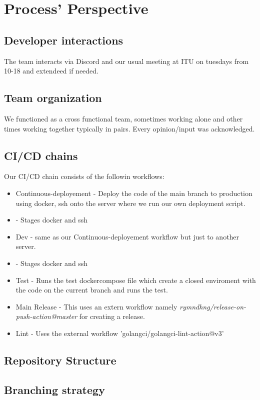 \section{Process' Perspective}

\subsection{Developer interactions}
The team interacts via Discord and our usual meeting at ITU on tuesdays from 10-18 and extendeed if needed.

\subsection{Team organization}
We functioned as a cross functional team, sometimes working alone and other times working together typically in pairs. Every opinion/input was acknowledged. 

\subsection{CI/CD chains}
Our CI/CD chain consists of the followin workflows:
\begin{itemize}
    \item Continuous-deployement - Deploy the code of the main branch to production using docker, ssh onto the server where we run our own deployment script.
    \item[]  - Stages docker and ssh
    \item Dev - same as our Continuous-deployement workflow but just to another server.
    \item[]  - Stages docker and ssh
    \item Test - Runs the test dockercompose file which create a closed enviroment with the code on the current branch and runs the test.
    \item Main Release - This uses an extern workflow namely \textit{rymndhng/release-on-push-action@master} for creating a release.
    \item Lint - Uses the external workflow 'golangci/golangci-lint-action@v3'
\end{itemize}

\subsection{Repository Structure}

\subsection{Branching strategy}

